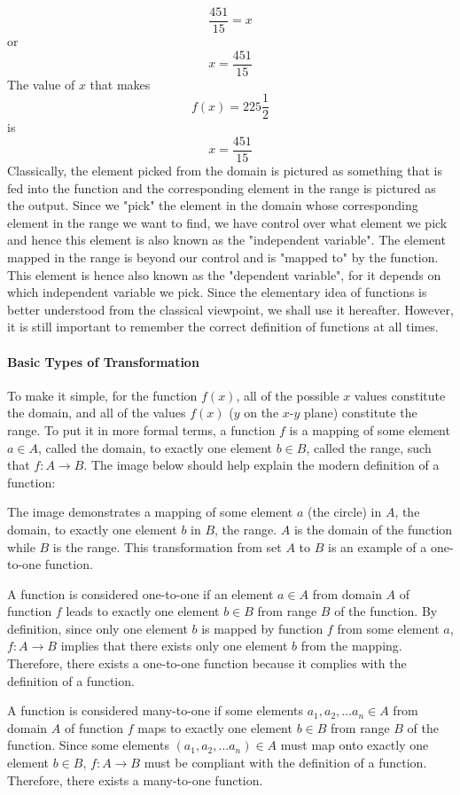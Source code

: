 $$
\frac{451}{15} = x
$$
or 
$$
x = \frac{451}{15}
$$
The value of $x$ that makes 
$$
f(x) = 225 \frac{1}{2}
$$
is 
$$
x = \frac{451}{15}
$$
Classically, the element picked from the domain is pictured as something that is fed into the function and the corresponding element in the range is pictured as the output. Since we "pick" the element in the domain whose corresponding element in the range we want to find, we have control over what element we pick and hence this element is also known as the "independent variable". The element mapped in the range is beyond our control and is "mapped to" by the function. This element is hence also known as the "dependent variable", for it depends on which independent variable we pick. Since the elementary idea of functions is better understood from the classical viewpoint, we shall use it hereafter. However, it is still important to remember the correct definition of functions at all times.

\paragraph{Basic Types of Transformation}

To make it simple, for the function $f(x)$, all of the possible $x$ values constitute the domain, and all of the values $f(x)$ ($y$ on the $x$-$y$ plane) constitute the range. To put it in more formal terms, a function $f$ is a mapping of some element $a \in A$, called the domain, to exactly one element $b \in B$, called the range, such that $f:A \to B$. The image below should help explain the modern definition of a function:

The image demonstrates a mapping of some element $a$ (the circle) in $A$, the domain, to exactly one element $b$ in $B$, the range. $A$ is the domain of the function while $B$ is the range. This transformation from set $A$ to $B$ is an example of a one-to-one function.


A function is considered one-to-one if an element $a \in A$ from domain $A$ of function $f$ leads to exactly one element $b \in B$ from range $B$ of the function. By definition, since only one element $b$ is mapped by function $f$ from some element $a$, $f:A \to B$ implies that there exists only one element $b$ from the mapping. Therefore, there exists a one-to-one function because it complies with the definition of a function. 

A function is considered many-to-one if some elements $a_1, a_2, \ldots a_n \in A$ from domain $A$ of function $f$ maps to exactly one element $b \in B$ from range $B$ of the function. Since some elements $(a_1, a_2, \ldots a_n) \in A$ must map onto exactly one element $b \in B$, $f:A \to B$ must be compliant with the definition of a function. Therefore, there exists a many-to-one function.

